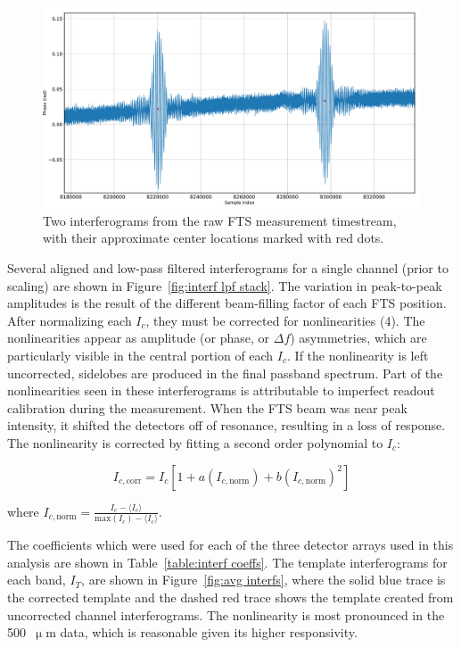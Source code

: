 \begin{figure}[!htbp]
\centering
\includegraphics[width=\textwidth]{figures/blast_data/fts/two_interf_zoom_2}
\caption[~Two interferograms from the raw FTS measurement timestream.]{Two interferograms from the raw FTS measurement timestream, with their approximate center locations marked with red dots.}
\label{fig:interf zoom}
\end{figure}

Several aligned and low-pass filtered interferograms for a single channel (prior to scaling) are shown in Figure~\ref{fig:interf lpf stack}. The variation in peak-to-peak amplitudes is the result of the different beam-filling factor of each FTS position. After normalizing each $I_{c}$, they must be corrected for nonlinearities (4). The nonlinearities appear as amplitude (or phase, or $\Delta f$) asymmetries, which are particularly visible in the central portion of each $I_{c}$. If the nonlinearity is left uncorrected, sidelobes are produced in the final passband spectrum. Part of the nonlinearities seen in these interferograms is attributable to imperfect readout calibration during the measurement. When the FTS beam was near peak intensity, it shifted the detectors off of resonance, resulting in a loss of response. The nonlinearity is corrected by fitting a second order polynomial to $I_{c}$:

\begin{equation}
  I_{c,\mathrm{corr}} = I_{c} \left[ 1 + a(I_{c,\mathrm{norm}}) + b(I_{c,\mathrm{norm}})^{2} \right]
\end{equation}

where $ I_{c,\mathrm{norm}} = \frac{ I_{c} - \langle I_{c} \rangle }{ \mathrm{max}(I_{c}) - \langle I_{c} \rangle }$.

The coefficients which were used for each of the three detector arrays used in this analysis are shown in Table~\ref{table:interf coeffs}. The template interferograms for each band, $I_{T}$, are shown in Figure~\ref{fig:avg interfs}, where the solid blue trace is the corrected template and the dashed red trace shows the template created from uncorrected channel interferograms. The nonlinearity is most pronounced in the 500~$\upmu$m data, which is reasonable given its higher responsivity.

